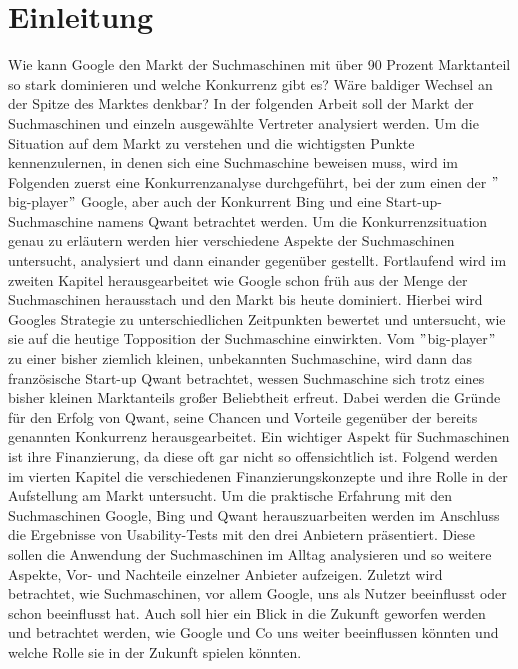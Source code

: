 \documentclass[11pt]{article}
\begin{document}
    \chapter{Einleitung}\label{ch:einleitung}
    Wie kann Google den Markt der Suchmaschinen mit über 90 Prozent Marktanteil so stark dominieren und welche Konkurrenz gibt es?
    Wäre baldiger Wechsel an der Spitze des Marktes denkbar?
    In der folgenden Arbeit soll der Markt der Suchmaschinen und einzeln ausgewählte Vertreter analysiert werden.
    Um die Situation auf dem Markt zu verstehen und die wichtigsten Punkte kennenzulernen, in denen sich eine Suchmaschine beweisen muss,
    wird im Folgenden zuerst eine Konkurrenzanalyse durchgeführt, bei der zum einen der \("\)big-player\("\) Google,
    aber auch der Konkurrent Bing und eine Start-up-Suchmaschine namens Qwant betrachtet werden.
    Um die Konkurrenzsituation genau zu erläutern werden hier verschiedene Aspekte der Suchmaschinen untersucht, analysiert und dann einander gegenüber gestellt.
    Fortlaufend wird im zweiten Kapitel herausgearbeitet wie Google schon früh aus der Menge der Suchmaschinen herausstach und den Markt bis heute dominiert.
    Hierbei wird Googles Strategie zu unterschiedlichen Zeitpunkten bewertet und untersucht, wie sie auf die heutige Topposition der Suchmaschine einwirkten.
    Vom \("\)big-player\("\) zu einer bisher ziemlich kleinen, unbekannten Suchmaschine,
    wird dann das französische Start-up Qwant betrachtet, wessen Suchmaschine sich trotz eines bisher kleinen Marktanteils großer Beliebtheit erfreut.
    Dabei werden die Gründe für den Erfolg von Qwant, seine Chancen und Vorteile gegenüber der bereits genannten Konkurrenz herausgearbeitet.
    Ein wichtiger Aspekt für Suchmaschinen ist ihre Finanzierung, da diese oft gar nicht so offensichtlich ist.
    Folgend werden im vierten Kapitel die verschiedenen Finanzierungskonzepte und ihre Rolle in der Aufstellung am Markt untersucht.
    Um die praktische Erfahrung mit den Suchmaschinen Google, Bing und Qwant herauszuarbeiten werden im Anschluss die Ergebnisse von Usability-Tests mit den drei Anbietern präsentiert.
    Diese sollen die Anwendung der Suchmaschinen im Alltag analysieren und so weitere Aspekte, Vor- und Nachteile einzelner Anbieter aufzeigen.
    Zuletzt wird betrachtet, wie Suchmaschinen, vor allem Google, uns als Nutzer beeinflusst oder schon beeinflusst hat.
    Auch soll hier ein Blick in die Zukunft geworfen werden und betrachtet werden, wie Google und Co uns weiter beeinflussen könnten und welche Rolle sie in der Zukunft spielen könnten.
\end{document}
